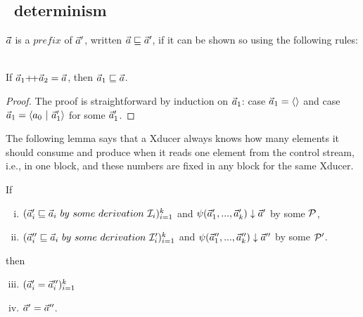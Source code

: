 \subsection{\fmsvcode \ determinism}

\begin{defi}
	$\vec a$ is a $prefix$ of $\vec a'$, written $\vec a \sqsubseteq \vec a'$, if it can be shown so using the following rules:\\
	
	\emph{}
	\\
	
\end{defi}

\begin{lem}\label{lem-app2pre}
	If $\a_1 {\++} \a_2 = \a$, then $\vec a_1 \sqsubseteq \vec a$.
\end{lem}
\begin{proof}
	The proof is straightforward by induction on $\vec a_1$: case $\vec a_1 = \langle \rangle$ and case $ \a_1 = \< a_0 \ | \ \a_1' \'>$ for some $\vec a_1'$.
\end{proof}

The following lemma says that a Xducer always knows how many elements it should consume and produce when it reads one element from the control stream, i.e., in one block, and these numbers are fixed in any block for the same Xducer.


\begin{lem} \label{lem-block-unique}
	If
	\begin{enumerate}[(i)]
		\item $(\a_i' \prefix  \a_i \ by \ some \ derivation \ \MI_{i})^k_{i=1}$ and ${\psi}(\vec a_1',...,\vec a_k') \downarrow \vec a'$ by some $\mathcal{P}$, 
		\item $(\a_i'' \prefix \a_i \ by \ some \ derivation \ \MI'_{i})^k_{i=1}$ and
		${\psi}(\vec a_1'',...,\vec a_k'') \downarrow \vec a''$ by some $\mathcal{P}'$.
	\end{enumerate} 
	then \begin{enumerate}[(i)]
		\setcounter{enumi}{2}
		\item $(\vec a_i' = \vec a_i'')^k_{i=1}$ 
		\item $\vec a' = \vec a''$.
	\end{enumerate}
\end{lem}

